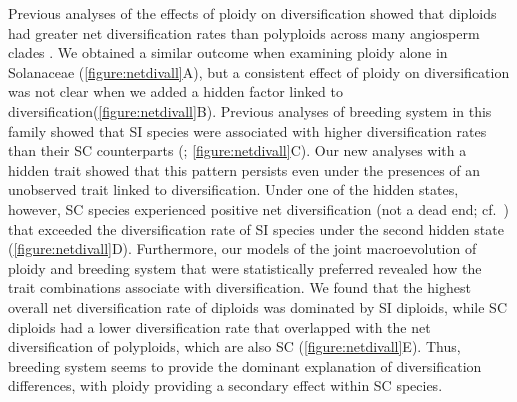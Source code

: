 Previous analyses of the effects of ploidy on diversification showed that diploids had greater net diversification rates than polyploids across many angiosperm clades \citep{mayrose_2011, mayrose_2015}. 
We obtained a similar outcome when examining ploidy alone in Solanaceae (\cref{figure:netdivall}A), but a consistent effect of ploidy on diversification was not clear when we added a  hidden factor linked to diversification(\cref{figure:netdivall}B).
%
Previous analyses of breeding system in this family showed that SI species were associated with higher diversification rates than their SC counterparts (\citealt{goldberg_2010}; \cref{figure:netdivall}C).
Our new analyses with a hidden trait showed that this pattern persists even under the presences of an unobserved trait linked to diversification.
Under one of the hidden states, however, SC species experienced positive net diversification (\ie not a dead end; cf.\ \citealt{igic_2013}) that exceeded the diversification rate of SI species under the second hidden state (\cref{figure:netdivall}D).
%
Furthermore, our models of the joint macroevolution of ploidy and breeding system that were statistically preferred revealed how the trait combinations associate with diversification.
We found that the highest overall net diversification rate of diploids was dominated by SI diploids, while SC diploids had a lower diversification rate that overlapped with the net diversification of polyploids, which are also SC (\cref{figure:netdivall}E).
Thus, breeding system seems to provide the dominant explanation of diversification differences, with ploidy providing a secondary effect within SC species.


